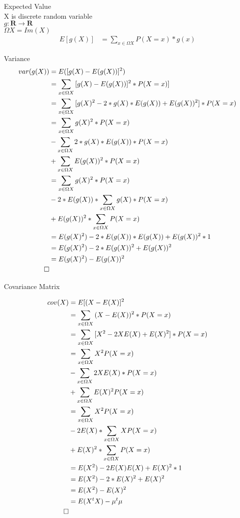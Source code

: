 \documentclass[]{article}
\title{}
\author{}
\begin{document}
	
Expected Value\\
X is discrete random variable\\
$g : \mathbf{R} \rightarrow \mathbf{R}$\\
$\Omega X = Im(X)$\\

\begin{align}
	E[g(X)] &= \sum_{x \in \Omega X} {P(X=x)*g(x)}
\end{align}

Variance\\

\begin{align}
	var(g(X)) &= E([g(X) - E(g(X))]^2)\\
	&= \sum_{x\in \Omega X} {[g(X) - E(g(X))]^2*P(X=x)]}\\
	&= \sum_{x\in \Omega X} {[g(X)^2 - 2*g(X)*E(g(X)) + E(g(X))^2]*P(X=x)}\\
	&= \sum_{x\in \Omega X} {g(X)^2*P(X=x)} \\&- \sum_{x\in \Omega X} {2*g(X)*E(g(X))*P(X=x)} \\&+ \sum_{x \in \Omega X} {E(g(X))^2*P(X=x)}\\
	&= \sum_{x\in \Omega X} {g(X)^2*P(X=x)} \\&- 2*E(g(X))*\sum_{x\in \Omega X} {g(X)*P(X=x)} \\&+ E(g(X))^2*\sum_{x \in \Omega X} {P(X=x)}\\
	&= E(g(X)^2) - 2*E(g(X))*E(g(X)) + E(g(X))^2*1\\
	&= E(g(X)^2) - 2*E(g(X))^2 + E(g(X))^2\\
	&= E(g(X)^2) - E(g(X))^2\\
	\qed
\end{align}

Covariance Matrix

\begin{align}
cov(X) &= E[(X-E(X)]^2\\
&= \sum_{x\in \Omega X} {(X-E(X))^2*P(X=x)}\\
&= \sum_{x\in \Omega X} {[X^2-2XE(X)+E(X)^2]*P(X=x)}\\
&= \sum_{x\in \Omega X} {X^2P(X=x)} \\&- \sum_{x\in \Omega X} {2XE(X)*P(X=x)} \\&+ \sum_{x \in \Omega X} {E(X)^2P(X=x)}\\
&= \sum_{x\in \Omega X} {X^2P(X=x)} \\&- 2E(X)*\sum_{x\in \Omega X} {XP(X=x)} \\&+ E(X)^2*\sum_{x \in \Omega X} {P(X=x)}\\
&= E(X^2)-2E(X)E(X)+E(X)^2*1\\
&= E(X^2)-2*E(X)^2+E(X)^2\\
&= E(X^2)-E(X)^2\\
&= E(X^tX)-\mu^t\mu\\
\qed
\end{align}
\end{document}
